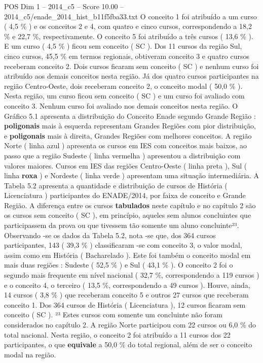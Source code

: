 \begin{textsample}{POS Dim 1 – 2014\_c5 – Score 10.00 – 2014\_c5/enade\_2014\_hist\_b11f5fba33.txt}
O conceito 1 foi atribuído a um curso ( 4,5 \% ) e os conceitos 2 e 4, com quatro e cinco cursos, correspondendo a 18,2 \% e 22,7 \%, respectivamente.
O conceito 5 foi atribuído a três cursos ( 13,6 \% ).
E um curso ( 4,5 \% ) ficou sem conceito ( SC ).
Dos 11 cursos da região Sul, cinco cursos, 45,5 \% em termos regionais, obtiveram conceito 3 e quatro cursos receberam conceito 2.
Dois cursos ficaram sem conceito ( SC ) e nenhum curso foi atribuído aos demais conceitos nesta região.
Já dos quatro cursos participantes na região Centro-Oeste, dois receberam conceito 2, o conceito modal ( 50,0 \% ).
Nesta região, um curso ficou sem conceito ( SC ) e um curso foi avaliado com conceito 3.
Nenhum curso foi avaliado nos demais conceitos nesta região.
O Gráfico 5.1 apresenta a distribuição do Conceito Enade segundo Grande Região : \textbf{poligonais} mais à esquerda representam Grandes Regiões com pior distribuição, e \textbf{poligonais} mais à direita, Grandes Regiões com melhores conceitos.
A região Norte ( linha azul ) apresenta os cursos em IES com conceitos mais baixos, ao passo que a região Sudeste ( linha vermelha ) apresentou a distribuição com valores maiores.
Cursos em IES das regiões Centro-Oeste ( linha preta ), Sul ( linha \textbf{roxa} ) e Nordeste ( linha verde ) apresentam uma situação intermediária.
A Tabela 5.2 apresenta a quantidade e distribuição de cursos de História ( Licenciatura ) participantes do ENADE/2014, por faixa de conceito e Grande Região.
A diferença entre os cursos \textbf{tabulados} neste capítulo e no capítulo 2 são os cursos sem conceito ( SC ), em princípio, aqueles sem alunos concluintes que participassem da prova ou que tivessem tão somente um aluno concluinte²³.
Observando -se os dados da Tabela 5.2, nota -se que, dos 364 cursos participantes, 143 ( 39,3 \% ) classificaram -se com conceito 3, o valor modal, assim como em História ( Bacharelado ).
Este foi também o conceito modal em mais duas regiões : Sudeste ( 52,5 \% ) e Sul ( 43,1 \% ).
O conceito 2 foi o segundo mais frequente em nível nacional ( 32,7 \%, correspondendo a 119 cursos ) e o conceito 4, o terceiro ( 13,5 \%, correspondendo a 49 cursos ).
Houve, ainda, 14 cursos ( 3,8 \% ) que receberam conceito 5 e outros 27 cursos que receberam conceito 1.
Dos 364 cursos de História ( Licenciatura ), 12 cursos ficaram sem conceito ( SC ). ²³ Estes cursos com somente um concluinte não foram considerados no capítulo 2.
A região Norte participou com 22 cursos ou 6,0 \% do total nacional.
Nesta região, o conceito 2 foi atribuído a 11 cursos dos 22 participantes, o que \textbf{equivale} a 50,0 \% do total regional, além de ser o conceito modal na região.

\end{textsample}
